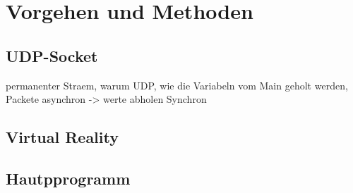 \section{Vorgehen und Methoden}
\subsection{UDP-Socket}
permanenter Straem, warum UDP, wie die Variabeln vom Main geholt werden, Packete asynchron -> werte abholen Synchron
\subsection{Virtual Reality}
\subsection{Hautpprogramm}





